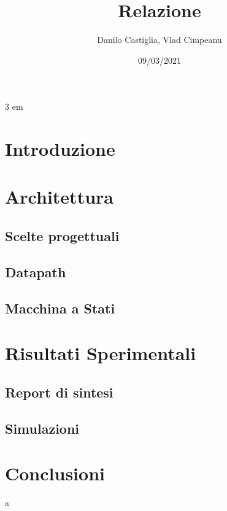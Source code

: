 \documentclass{article}
\title{Relazione}
\date{09/03/2021}
\author{Danilo Castiglia, Vlad Cimpeanu}
\begin{document}
\maketitle
{}
\newpage
{}
\setlenght{\parskip} {3 em} %

\section{Introduzione}
\section{Architettura}
\subsection{Scelte progettuali}
\subsection{Datapath}

\subsection{Macchina a Stati}

\section{Risultati Sperimentali}
\subsection{Report di sintesi}
\subsection{Simulazioni}
\section{Conclusioni}

a


\end{document}
